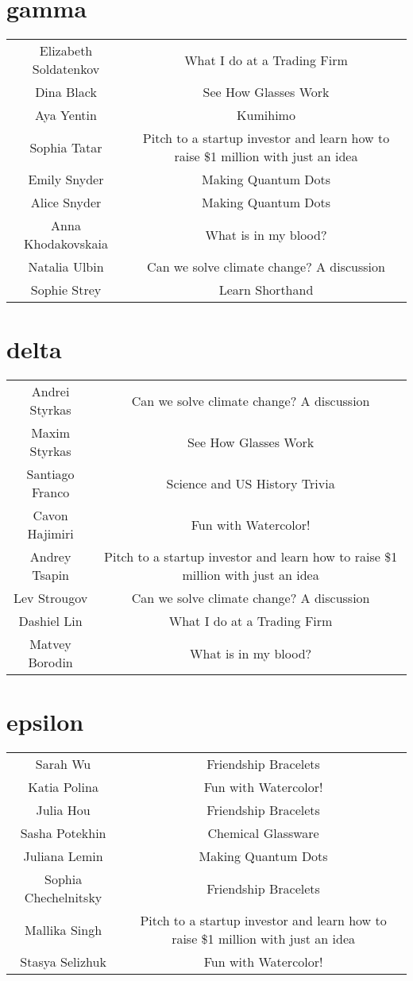 \documentclass{article}
\begin{document}
\section*{gamma}
\setlength{\tabcolsep}{60pt}
\begin{tabular}{c c}
Elizabeth Soldatenkov & What I do at a Trading Firm \\
Dina Black & See How Glasses Work \\
Aya Yentin & Kumihimo \\
Sophia Tatar & Pitch to a startup investor and learn how to raise \$1 million with just an idea \\
Emily Snyder & Making Quantum Dots \\
Alice Snyder & Making Quantum Dots \\
Anna Khodakovskaia & What is in my blood? \\
Natalia Ulbin & Can we solve climate change? A discussion \\
Sophie Strey & Learn Shorthand \\
\end{tabular}
\section*{delta}
\setlength{\tabcolsep}{60pt}
\begin{tabular}{c c}
Andrei Styrkas & Can we solve climate change? A discussion \\
Maxim Styrkas & See How Glasses Work \\
Santiago Franco & Science and US History Trivia \\
Cavon Hajimiri & Fun with Watercolor! \\
Andrey Tsapin & Pitch to a startup investor and learn how to raise \$1 million with just an idea \\
Lev Strougov & Can we solve climate change? A discussion \\
Dashiel Lin & What I do at a Trading Firm \\
Matvey Borodin & What is in my blood? \\
\end{tabular}
\section*{epsilon}
\setlength{\tabcolsep}{60pt}
\begin{tabular}{c c}
Sarah Wu & Friendship Bracelets \\
Katia Polina & Fun with Watercolor! \\
Julia Hou & Friendship Bracelets \\
Sasha Potekhin & Chemical Glassware \\
Juliana Lemin & Making Quantum Dots \\
Sophia Chechelnitsky & Friendship Bracelets \\
Mallika Singh & Pitch to a startup investor and learn how to raise \$1 million with just an idea \\
Stasya Selizhuk & Fun with Watercolor! \\
\end{tabular}
\end{document}
